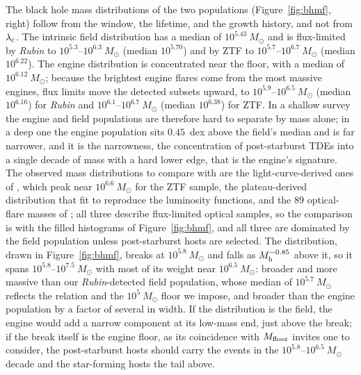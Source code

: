 \documentclass[twocolumn,pdftex]{aastex701}
\newcommand{\msun}{M_{\odot}\xspace}
\newcommand{\lsst}{{\it Rubin}\xspace}
\newcommand{\lamc}{\lambda_{\rm c}\xspace}
\begin{document}
The black hole mass distributions of the two populations (Figure~\ref{fig:bhmf}, right) follow from the window, the lifetime, and the growth history, and not from $\lamc$. The intrinsic field distribution has a median of $10^{5.43}~\msun$ and is flux-limited by \lsst to $10^{5.3}$--$10^{6.3}~\msun$ (median $10^{5.70}$) and by ZTF to $10^{5.7}$--$10^{6.7}~\msun$ (median $10^{6.22}$). The engine distribution is concentrated near the floor, with a median of $10^{6.12}~\msun$; because the brightest engine flares come from the most massive engines, flux limits move the detected subsets upward, to $10^{5.9}$--$10^{6.5}~\msun$ (median $10^{6.16}$) for \lsst and $10^{6.1}$--$10^{6.7}~\msun$ (median $10^{6.38}$) for ZTF. In a shallow survey the engine and field populations are therefore hard to separate by mass alone; in a deep one the engine population sits $0.45$~dex above the field's median and is far narrower, and it is the narrowness, the concentration of post-starburst TDEs into a single decade of mass with a hard lower edge, that is the engine's signature. The observed mass distributions to compare with are the light-curve-derived ones of \citet{Yao:2023a}, which peak near $10^{6.6}~\msun$ for the ZTF sample, the plateau-derived distribution that \citet{Mummery:2025a} fit to reproduce the luminosity functions, and the $89$ optical-flare masses of \citet{Mummery:2026a}; all three describe flux-limited optical samples, so the comparison is with the filled histograms of Figure~\ref{fig:bhmf}, and all three are dominated by the field population unless post-starburst hosts are selected. The \citet{Mummery:2025a} distribution, drawn in Figure~\ref{fig:bhmf}, breaks at $10^{5.8}~\msun$ and falls as $M_{\rm h}^{-0.85}$ above it, so it spans $10^{5.8}$--$10^{7.5}~\msun$ with most of its weight near $10^{6.5}~\msun$: broader and more massive than our \lsst-detected field population, whose median of $10^{5.7}~\msun$ reflects the \citet{Reines:2015a} relation and the $10^{5}~\msun$ floor we impose, and broader than the engine population by a factor of several in width. If the \citet{Mummery:2025a} distribution is the field, the engine would add a narrow component at its low-mass end, just above the break; if the break itself is the engine floor, as its coincidence with $M_{\rm floor}$ invites one to consider, the post-starburst hosts should carry the events in the $10^{5.8}$--$10^{6.5}~\msun$ decade and the star-forming hosts the tail above.
\end{document}
